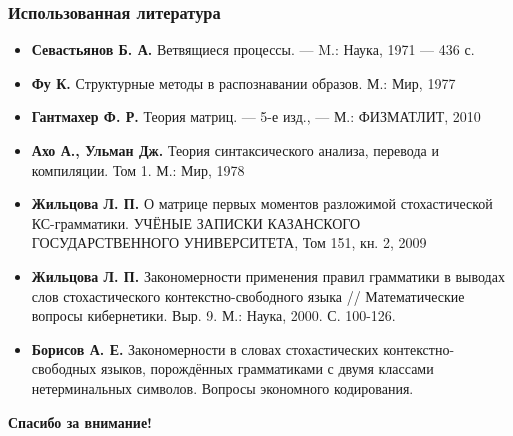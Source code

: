 \documentclass{beamer}
\begin{document}
	\begin{frame}
		\frametitle{Использованная литература}
		{\footnotesize
		\begin{itemize}
			\item \textbf{Севастьянов Б. А.} Ветвящиеся процессы. --- M.: Наука, 1971 --- 436 с.
			\item \textbf{Фу К.} Структурные методы в распознавании образов. М.: Мир, 1977
			\item \textbf{Гантмахер Ф. Р.} Теория матриц. --- 5-е изд., --- М.: ФИЗМАТЛИТ, 2010
			\item \textbf{Ахо А., Ульман Дж.} Теория синтаксического анализа, перевода и компиляции. Том 1. М.: Мир, 1978
			\item \textbf{Жильцова Л. П.} О матрице первых моментов разложимой стохастической КС-грамматики. УЧЁНЫЕ ЗАПИСКИ КАЗАНСКОГО ГОСУДАРСТВЕННОГО УНИВЕРСИТЕТА, Том 151, кн. 2, 2009
			\item \textbf{Жильцова Л. П.} Закономерности применения правил грамматики в выводах слов стохастического контекстно-свободного языка // Математические вопросы кибернетики. Выр. 9. М.: Наука, 2000. С. 100-126.
			\item \textbf{Борисов А. Е.} Закономерности в словах стохастических контекстно-свободных языков, порождённых грамматиками с двумя классами нетерминальных символов. Вопросы экономного кодирования.
		\end{itemize}
		}
	\end{frame}
	
	\begin{frame}
		\begin{center}
			{\Huge \textbf{Спасибо за внимание!}}
		\end{center}
	\end{frame}
\end{document}

